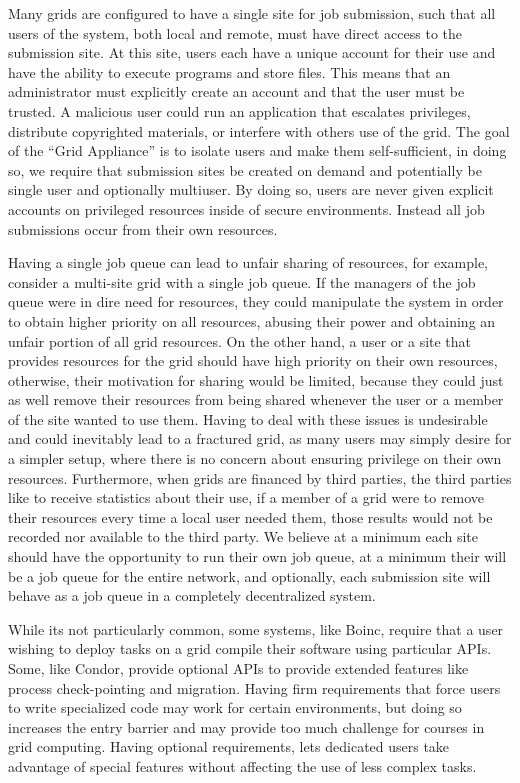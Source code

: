 \documentclass[conference]{IEEEtran}
\begin{document}
Many grids are configured to have a single site for job submission, such that
all users of the system, both local and remote, must have direct access to the
submission site.  At this site, users each have a unique account for their use
and have the ability to execute programs and store files.  This means that an
administrator must explicitly create an account and that the user must be
trusted.  A malicious user could run an application that escalates privileges,
distribute copyrighted materials, or interfere with others use of the grid.
The goal of the ``Grid Appliance'' is to isolate users and make them
self-sufficient, in doing so, we require that submission sites be created on
demand and potentially be single user and optionally multiuser.  By doing so,
users are never given explicit accounts on privileged resources inside of
secure environments.  Instead all job submissions occur from their own
resources.

Having a single job queue can lead to unfair sharing of resources, for example,
consider a multi-site grid with a single job queue.  If the managers of the job
queue were in dire need for resources, they could manipulate the system in
order to obtain higher priority on all resources, abusing their power and
obtaining an unfair portion of all grid resources.  On the other hand, a user
or a site that provides resources for the grid should have high priority on
their own resources, otherwise, their motivation for sharing would be limited,
because they could just as well remove their resources from being shared
whenever the user or a member of the site wanted to use them.  Having to deal
with these issues is undesirable and could inevitably lead to a fractured grid,
as many users may simply desire for a simpler setup, where there is no concern
about ensuring privilege on their own resources.  Furthermore, when grids are
financed by third parties, the third parties like to receive statistics about
their use, if a member of a grid were to remove their resources every time a
local user needed them, those results would not be recorded nor available to
the third party.  We believe at a minimum each site should have the opportunity
to run their own job queue, at a minimum their will be a job queue for the
entire network, and optionally, each submission site will behave as a job queue
in a completely decentralized system.

While its not particularly common, some systems, like Boinc, require that a
user wishing to deploy tasks on a grid compile their software using particular
APIs.  Some, like Condor, provide optional APIs to provide extended features
like process check-pointing and migration.  Having firm requirements that force
users to write specialized code may work for certain environments, but doing so
increases the entry barrier and may provide too much challenge for courses in
grid computing.  Having optional requirements, lets dedicated users take
advantage of special features without affecting the use of less complex tasks.
\end{document}
